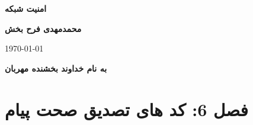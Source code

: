 \documentclass{report}
\begin{document}
	
	\begin{titlepage}
		
		\centering
		\vspace*{2cm}
		\textbf{\LARGE امنیت شبکه}
		\vspace{1cm}
		
		
		
		\vfill
		
		\textbf{محمدمهدی فرح بخش}
		
		\vspace{1cm}
		\today
	\end{titlepage}
	
	
	\begin{center}
		\textbf{به نام خداوند بخشنده مهربان}
	\end{center}
	
	\section{فصل 6: کد های تصدیق صحت پیام}
	
\end{document}
